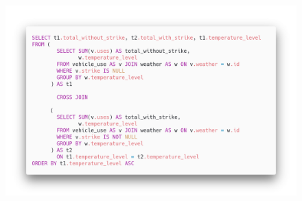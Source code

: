 \begin{figure}[H]                                                                                                                                                            
\centering                                                                                                                                                                   
\includegraphics[width=\textwidth]{images/query4}                                                                                                                                   
\label{fig:query4}                                                                                                                                                           
\end{figure}

